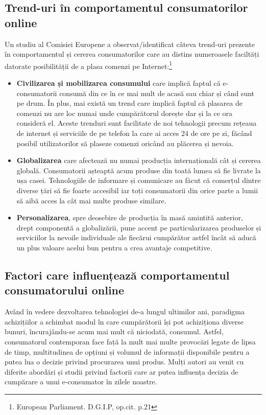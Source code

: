 \documentclass[a4paper, 12pt]{article}
\begin{document}
		\subsection{Trend-uri în comportamentul consumatorilor online} 
		\quad Un studiu al Comisiei Europene a observat/identificat câteva trend-uri prezente în comportamentul și cererea consumatorilor care au distins numeroasele faciltăți datorate posibilității de a plasa comenzi pe Internet:\footnote{European Parliament. D.G.I.P, op.cit. p.21}
		\begin{itemize}
			\item \textbf{Civilizarea și mobilizarea consumului} care implică faptul că e-consumatorii consumă din ce în ce mai mult de acasă sau chiar și când sunt pe drum. În plus, mai există un trend care implică faptul că plasarea de comenzi nu are loc numai unde cumpărătorul dorește dar și la ce ora consideră el. Aceste trenduri sunt facilitate de noi tehnologii precum rețeaua de internet și serviciile de pe telefon la care ai acces 24 de ore pe zi, făcând posibil utilizatorilor să plaseze comenzi oricând au plăcerea și nevoia.
			\item \textbf{Globalizarea} care afectează nu numai producția internațională cât și cererea globală. Consumatorii așteaptă acum produse din toată lumea să fie livrate la ușa casei. Tehnologiile de informare și comunicare au făcut că comerțul dintre diverse țări să fie foarte accesibil iar toți consumatorii din orice parte a lumii să aibă acces la cât mai multe produse similare.
			\item \textbf{Personalizarea}, spre deosebire de producția în masă amintită anterior, drept componentă a globalizării, pune accent pe particularizarea produselor și serviciilor la nevoile individuale ale fiecărui cumpărător astfel încât să aducă un plus valoare acelui bun pentru a crea avantaje competitive.
		\end{itemize}
		\subsection{Factori care influențează comportamentul consumatorului online}
	\qquad\space Având în vedere dezvoltarea tehnologiei de-a lungul ultimilor ani,  paradigma achizițiilor a schimbat modul în care cumpărătorii își pot achiziționa diverse bunuri, încurajându-se acum mai mult că niciodată, consumul. Astfel, consumatorul contemporan face față la mult mai multe provocări legate de lipsa de timp, multitudinea de opțiuni și volumul de informații disponibile pentru a putea lua o decizie privind procurarea unui produs. Mulți autori au venit cu diferite abordări și studii privind factorii care ar putea influența decizia de cumpărare a unui e-consumator în zilele noastre.
	
\end{document}
